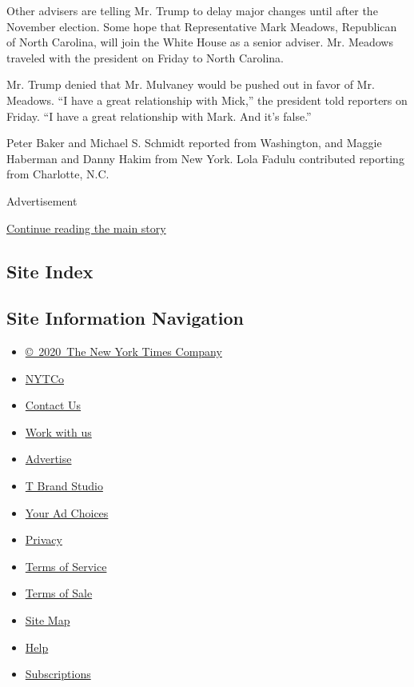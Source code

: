 Other advisers are telling Mr. Trump to delay major changes until after
the November election. Some hope that Representative Mark Meadows,
Republican of North Carolina, will join the White House as a senior
adviser. Mr. Meadows traveled with the president on Friday to North
Carolina.

Mr. Trump denied that Mr. Mulvaney would be pushed out in favor of Mr.
Meadows. ``I have a great relationship with Mick,'' the president told
reporters on Friday. ``I have a great relationship with Mark. And it's
false.''

Peter Baker and Michael S. Schmidt reported from Washington, and Maggie
Haberman and Danny Hakim from New York. Lola Fadulu contributed
reporting from Charlotte, N.C.

Advertisement

\protect\hyperlink{after-bottom}{Continue reading the main story}

\hypertarget{site-index}{%
\subsection{Site Index}\label{site-index}}

\hypertarget{site-information-navigation}{%
\subsection{Site Information
Navigation}\label{site-information-navigation}}

\begin{itemize}
\tightlist
\item
  \href{https://help.nytimes.com/hc/en-us/articles/115014792127-Copyright-notice}{©~2020~The
  New York Times Company}
\end{itemize}

\begin{itemize}
\tightlist
\item
  \href{https://www.nytco.com/}{NYTCo}
\item
  \href{https://help.nytimes.com/hc/en-us/articles/115015385887-Contact-Us}{Contact
  Us}
\item
  \href{https://www.nytco.com/careers/}{Work with us}
\item
  \href{https://nytmediakit.com/}{Advertise}
\item
  \href{http://www.tbrandstudio.com/}{T Brand Studio}
\item
  \href{https://www.nytimes.com/privacy/cookie-policy\#how-do-i-manage-trackers}{Your
  Ad Choices}
\item
  \href{https://www.nytimes.com/privacy}{Privacy}
\item
  \href{https://help.nytimes.com/hc/en-us/articles/115014893428-Terms-of-service}{Terms
  of Service}
\item
  \href{https://help.nytimes.com/hc/en-us/articles/115014893968-Terms-of-sale}{Terms
  of Sale}
\item
  \href{https://spiderbites.nytimes.com}{Site Map}
\item
  \href{https://help.nytimes.com/hc/en-us}{Help}
\item
  \href{https://www.nytimes.com/subscription?campaignId=37WXW}{Subscriptions}
\end{itemize}
